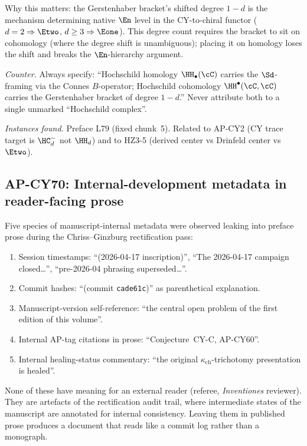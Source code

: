 Why this matters: the Gerstenhaber bracket's shifted degree
$1 - d$ is the mechanism determining native $\En$ level in the
CY-to-chiral functor ($d = 2 \Rightarrow \Etwo$,
$d \ge 3 \Rightarrow \Eone$).  This degree count requires the
bracket to sit on cohomology (where the degree shift is
unambiguous); placing it on homology loses the shift and breaks
the $\En$-hierarchy argument.

\emph{Counter.}  Always specify: ``Hochschild homology
$\HH_\bullet(\cC)$ carries the $\Sd$-framing via the Connes
$B$-operator; Hochschild cohomology $\HH^\bullet(\cC, \cC)$ carries
the Gerstenhaber bracket of degree $1 - d$.''  Never attribute both
to a single unmarked ``Hochschild complex''.

\emph{Instances found.}  Preface L79 (fixed chunk~5).  Related to
AP-CY2 (CY trace target is $\HC^-_d$ not $\HH_d$) and to HZ3-5
(derived center vs Drinfeld center vs $\Etwo$).

\subsection{AP-CY70: Internal-development metadata in reader-facing
  prose}

Five species of manuscript-internal metadata were observed leaking
into preface prose during the Chriss--Ginzburg rectification pass:
\begin{enumerate}[label=(\alph*),nosep]
\item Session timestamps: ``(2026-04-17 inscription)'',
  ``The 2026-04-17 campaign closed\ldots'', ``pre-2026-04 phrasing
  superseded\ldots''.
\item Commit hashes: ``(commit \texttt{cade61c})'' as parenthetical
  explanation.
\item Manuscript-version self-reference: ``the central open problem
  of the first edition of this volume''.
\item Internal AP-tag citations in prose: ``Conjecture~CY-C,
  AP-CY60''.
\item Internal healing-status commentary: ``the original
  $\kappa_{\mathrm{ch}}$-trichotomy presentation is healed''.
\end{enumerate}
None of these have meaning for an external reader (referee,
\emph{Inventiones} reviewer).  They are artefacts of the
rectification audit trail, where intermediate states of the
manuscript are annotated for internal consistency.  Leaving them in
published prose produces a document that reads like a commit log
rather than a monograph.

